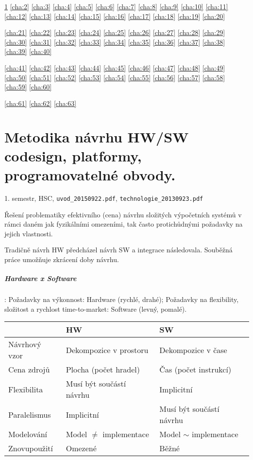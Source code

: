 \documentclass[a4paper, 11pt]{report}
\begin{document}
\ref{cha:1}
\ref{cha:2}
\ref{cha:3}
\ref{cha:4}
\ref{cha:5}
\ref{cha:6}
\ref{cha:7}
\ref{cha:8}
\ref{cha:9}
\ref{cha:10}
\ref{cha:11}
\ref{cha:12}
\ref{cha:13}
\ref{cha:14}
\ref{cha:15}
\ref{cha:16}
\ref{cha:17}
\ref{cha:18}
\ref{cha:19}
\ref{cha:20}

\ref{cha:21}
\ref{cha:22}
\ref{cha:23}
\ref{cha:24}
\ref{cha:25}
\ref{cha:26}
\ref{cha:27}
\ref{cha:28}
\ref{cha:29}
\ref{cha:30}
\ref{cha:31}
\ref{cha:32}
\ref{cha:33}
\ref{cha:34}
\ref{cha:35}
\ref{cha:36}
\ref{cha:37}
\ref{cha:38}
\ref{cha:39}
\ref{cha:40}

\ref{cha:41}
\ref{cha:42}
\ref{cha:43}
\ref{cha:44}
\ref{cha:45}
\ref{cha:46}
\ref{cha:47}
\ref{cha:48}
\ref{cha:49}
\ref{cha:50}
\ref{cha:51}
\ref{cha:52}
\ref{cha:53}
\ref{cha:54}
\ref{cha:55}
\ref{cha:56}
\ref{cha:57}
\ref{cha:58}
\ref{cha:59}
\ref{cha:60}

\ref{cha:61}
\ref{cha:62}
\ref{cha:63}
\newpage

\tableofcontents

\chapter{Metodika návrhu HW/SW codesign, platformy, programovatelné obvody.} \label{cha:1}
1. semestr, HSC, \texttt{uvod\_20150922.pdf}, \texttt{technologie\_20130923.pdf}

Řešení problematiky efektivního (cena) návrhu složitých výpočetních systémů v rámci daném jak fyzikálními omezeními, tak často protichůdnými požadavky na jejich vlastnosti.

Tradičně návrh HW předcházel návrh SW a integrace následovala. Souběžná práce umožňuje zkrácení doby návrhu.

\paragraph{Hardware x Software}: Požadavky na výkonnost: Hardware (rychlé, drahé); Požadavky na flexibility, složitost a rychlost time-to-market: Software (levný, pomalé).

\begin{tabular}{l | l | l |}
					& HW						& SW \\ \hline
	Návrhový vzor	& Dekompozice v prostoru	& Dekompozice v čase \\ \hline
	Cena zdrojů		& Plocha (počet hradel)		& Čas (počet instrukcí) \\ \hline
	Flexibilita		& Musí být součástí návrhu	& Implicitní \\ \hline
	Paralelismus	& Implicitní				& Musí být součástí návrhu \\ \hline
	Modelování		& Model $\not=$ implementace& Model $\sim$ implementace \\ \hline
	Znovupoužití	& Omezené					& Běžné \\ \hline
\end{tabular}
\end{document}
